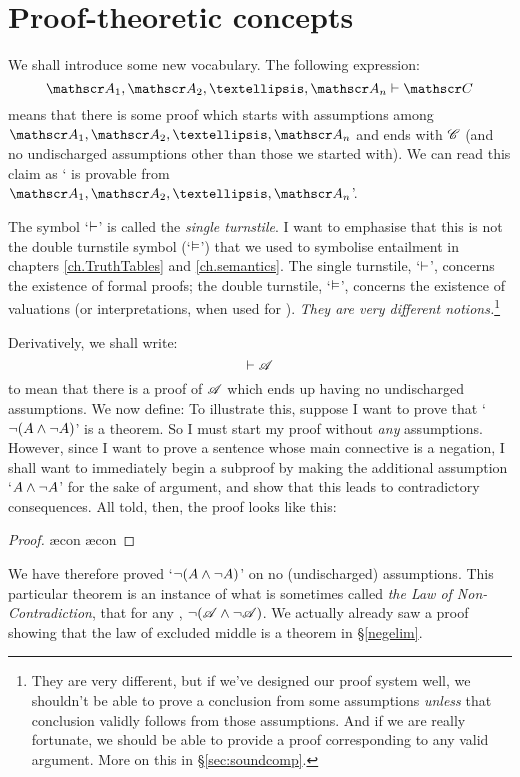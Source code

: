 \chapter{Proof-theoretic concepts}\label{s:ProofTheoreticConcepts}

We shall introduce some new vocabulary. The following expression:
$$\meta{A}_1, \meta{A}_2, …, \meta{A}_n \proves \meta{C}$$
means that there is some proof which starts with assumptions among $\meta{A}_1, \meta{A}_2, …, \meta{A}_n$ and ends with $\mathscr{C}$ (and no undischarged assumptions other than those we started with). We can read this claim as ` is provable from $\meta{A}_1, \meta{A}_2, …, \meta{A}_n$'.

The symbol `$\vdash$' is called the \emph{single turnstile}. I want to emphasise that this is not the {double turnstile} symbol (`$\vDash$') that we used to symbolise entailment in chapters \ref{ch.TruthTables} and \ref{ch.semantics}. The single turnstile, `$\vdash$', concerns the existence of formal proofs; the double turnstile, `$\vDash$', concerns the existence of valuations (or interpretations, when used for \FOL). \emph{They are very different notions.}\footnote{They are very different, but if we've designed our proof system well, we shouldn't be able to prove a conclusion from some assumptions \emph{unless} that conclusion validly follows from those assumptions. And if we are really fortunate, we should be able to provide a proof corresponding to any valid argument. More on this in §\ref{sec:soundcomp}.}

Derivatively, we shall write:
$$\vdash \mathscr{A}$$
to mean that there is a proof of $\mathscr{A}$ which ends up having no undischarged assumptions. We now define:
To illustrate this, suppose I want to prove that `$\neg (A \wedge \neg A)$' is a theorem. So I must start my proof without \emph{any} assumptions. However, since I want to prove a sentence whose main connective is a negation, I shall want to  immediately begin a subproof by making the additional assumption `$A \wedge \neg A$' for the sake of argument, and show that this leads to contradictory consequences. All told, then, the proof looks like this:
	\begin{proof}
		\open
			\ae{con}
			\ae{con}
		\close
	\end{proof}
We have therefore proved `$\neg (A \wedge \neg A)$' on no (undischarged) assumptions. This particular theorem is an instance of what is sometimes called \emph{the Law of Non-Contradiction}, that for any , $\neg(\mathscr{A}\wedge\neg\mathscr{A})$. We actually already saw a proof showing that the law of excluded middle is a theorem in §\ref{negelim}.


